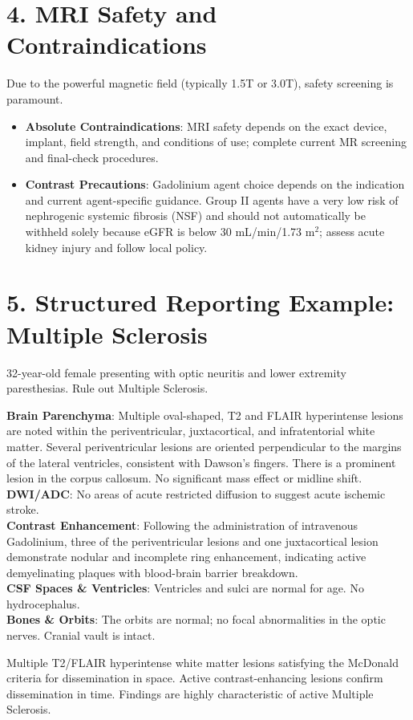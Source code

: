 \section*{4. MRI Safety and Contraindications}
Due to the powerful magnetic field (typically 1.5T or 3.0T), safety screening is paramount. 

\begin{itemize}
    \item \textbf{Absolute Contraindications}: MRI safety depends on the exact device, implant, field strength, and conditions of use; complete current MR screening and final-check procedures.
    \item \textbf{Contrast Precautions}: Gadolinium agent choice depends on the indication and current agent-specific guidance. Group II agents have a very low risk of nephrogenic systemic fibrosis (NSF) and should not automatically be withheld solely because eGFR is below 30 mL/min/1.73 m$^2$; assess acute kidney injury and follow local policy.
\end{itemize}


\section*{5. Structured Reporting Example: Multiple Sclerosis}

\begin{testbox}[Indications:]
32-year-old female presenting with optic neuritis and lower extremity paresthesias. Rule out Multiple Sclerosis.
\end{testbox}
\begin{refbox}[Findings:]
\textbf{Brain Parenchyma}: Multiple oval-shaped, T2 and FLAIR hyperintense lesions are noted within the periventricular, juxtacortical, and infratentorial white matter. Several periventricular lesions are oriented perpendicular to the margins of the lateral ventricles, consistent with Dawson's fingers. There is a prominent lesion in the corpus callosum. No significant mass effect or midline shift.\\
\textbf{DWI/ADC}: No areas of acute restricted diffusion to suggest acute ischemic stroke.\\
\textbf{Contrast Enhancement}: Following the administration of intravenous Gadolinium, three of the periventricular lesions and one juxtacortical lesion demonstrate nodular and incomplete ring enhancement, indicating active demyelinating plaques with blood-brain barrier breakdown.\\
\textbf{CSF Spaces \& Ventricles}: Ventricles and sulci are normal for age. No hydrocephalus.\\
\textbf{Bones \& Orbits}: The orbits are normal; no focal abnormalities in the optic nerves. Cranial vault is intact.
\end{refbox}
\begin{pearlbox}[Impression:]
Multiple T2/FLAIR hyperintense white matter lesions satisfying the McDonald criteria for dissemination in space. Active contrast-enhancing lesions confirm dissemination in time. Findings are highly characteristic of active Multiple Sclerosis.
\end{pearlbox}

\clearpage
